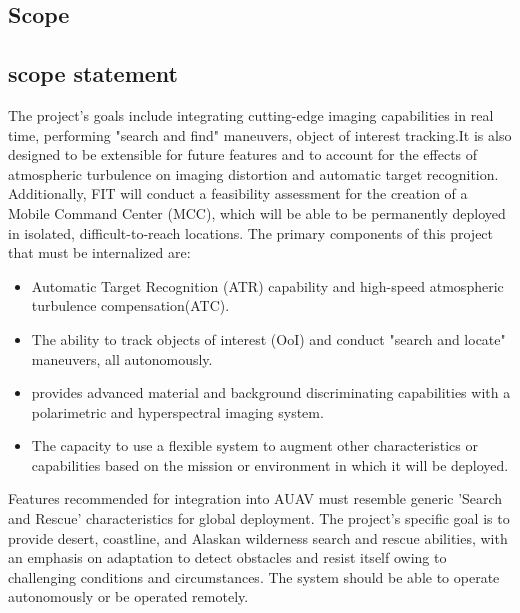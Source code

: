 \begin{fullwidth}
\section{Scope}
\subsection{scope statement}
The project's goals include integrating cutting-edge imaging capabilities in real time, performing "search and find" maneuvers, object of interest tracking.It is also designed to be extensible for future features and to account for the effects of atmospheric turbulence on imaging distortion and automatic target recognition. Additionally, FIT will conduct a feasibility assessment for the creation of a Mobile Command Center (MCC), which will be able to be permanently deployed in isolated, difficult-to-reach locations. The primary components of this project that must be internalized are:
\begin{itemize}
\item{Automatic Target Recognition (ATR) capability and high-speed atmospheric turbulence compensation(ATC).}

\item{The ability to track objects of interest (OoI) and conduct "search and locate" maneuvers, all autonomously.}

\item{provides advanced material and background discriminating capabilities with a polarimetric and hyperspectral imaging system.}

\item{The capacity to use a flexible system to augment other characteristics or capabilities based on the mission or environment in which it will be deployed.}
\end{itemize}
Features recommended for integration into AUAV must resemble generic 'Search and Rescue' characteristics for global deployment. The project's specific goal is to provide desert, coastline, and Alaskan wilderness search and rescue abilities, with an emphasis on adaptation to detect obstacles and resist itself owing to challenging conditions and circumstances. The system should be able to operate autonomously or be operated remotely.


\end{fullwidth}
